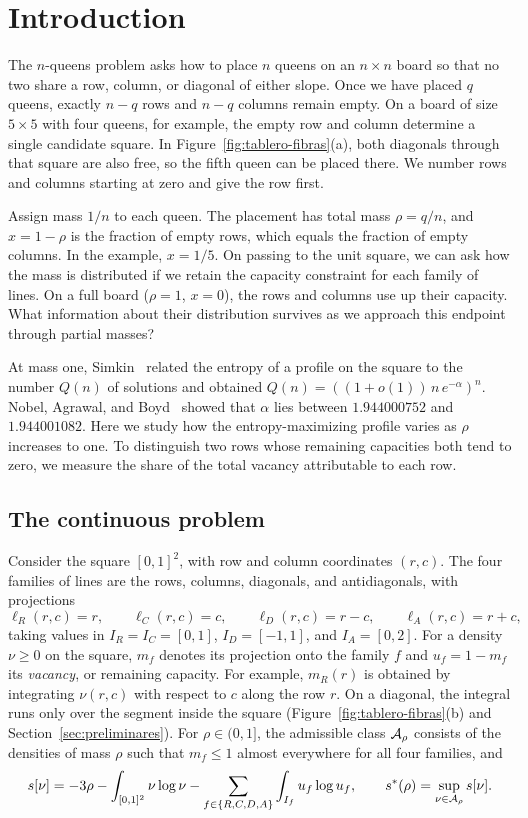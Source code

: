 \section{Introduction}\label{sec:intro}

The $n$-queens problem asks how to place $n$ queens on an $n\times n$ board so that no two share a row, column, or diagonal of either
slope. Once we have placed $q$ queens, exactly $n-q$ rows and $n-q$ columns remain empty. On a board of size $5\times5$ with four
queens, for example, the empty row and column determine a single candidate square. In Figure~\ref{fig:tablero-fibras}(a), both
diagonals through that square are also free, so the fifth queen can be placed there. We number rows and columns starting at zero and
give the row first.



Assign mass $1/n$ to each queen. The placement has total mass $\rho=q/n$, and $x=1-\rho$ is the fraction of empty rows, which equals
the fraction of empty columns. In the example, $x=1/5$. On passing to the unit square, we can ask how the mass is distributed if we
retain the capacity constraint for each family of lines. On a full board ($\rho=1$, $x=0$), the rows and columns use up their capacity.
What information about their distribution survives as we approach this endpoint through partial masses?

At mass one, Simkin~\cite{Simkin} related the entropy of a profile on the square to the number $Q(n)$ of solutions and obtained
$Q(n)=((1+o(1))\,n\,e^{-\alpha})^n$. Nobel, Agrawal, and Boyd~\cite{NAB} showed that $\alpha$ lies between $1.944000752$ and
$1.944001082$. Here we study how the entropy-maximizing profile varies as $\rho$ increases to one. To distinguish two rows whose
remaining capacities both tend to zero, we measure the share of the total vacancy attributable to each row.

\subsection{The continuous problem}


Consider the square $[0,1]^2$, with row and column coordinates $(r,c)$. The four families of lines are the rows, columns, diagonals, and
antidiagonals, with projections \[
 \ell_R(r,c)=r,\qquad \ell_C(r,c)=c,\qquad \ell_D(r,c)=r-c,\qquad \ell_A(r,c)=r+c,
\] taking values in $I_R=I_C=[0,1]$, $I_D=[-1,1]$, and $I_A=[0,2]$. For a density $\nu\ge0$ on the square, $m_f$ denotes its projection
onto the family $f$ and $u_f=1-m_f$ its \emph{vacancy}, or remaining capacity. For example, $m_R(r)$ is obtained by integrating
$\nu(r,c)$ with respect to $c$ along the row $r$. On a diagonal, the integral runs only over the segment inside the square
(Figure~\ref{fig:tablero-fibras}(b) and Section~\ref{sec:preliminares}). For $\rho\in(0,1]$, the admissible class ${\mathcal{A}}_\rho$ consists
of the densities of mass $\rho$ such that $m_f\le1$ almost everywhere for all four families, and \begin{equation}\label{eq:funcional}
 s[\nu]=-3\rho-\int_{[0,1]^2}\nu\log\nu-\sum_{f\in\{R,C,D,A\}}\int_{I_f}u_f\log u_f,\qquad
 s^{*}(\rho)=\sup_{\nu\in{\mathcal{A}}_\rho}s[\nu].
\end{equation}

